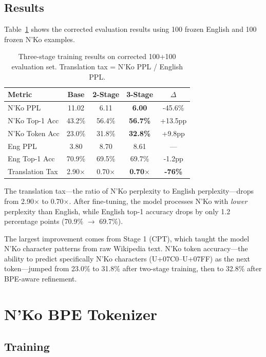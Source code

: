 \documentclass[11pt]{article}
\begin{document}
\subsection{Results}

Table~\ref{tab:main-results} shows the corrected evaluation results using 100 frozen English and 100 frozen N'Ko examples.

\begin{table}[t]
\centering
\small
\begin{tabular}{lcccc}
\toprule
\textbf{Metric} & \textbf{Base} & \textbf{2-Stage} & \textbf{3-Stage} & \textbf{$\Delta$} \\
\midrule
N'Ko PPL & 11.02 & 6.11 & \textbf{6.00} & -45.6\% \\
N'Ko Top-1 Acc & 43.2\% & 56.4\% & \textbf{56.7\%} & +13.5pp \\
N'Ko Token Acc & 23.0\% & 31.8\% & \textbf{32.8\%} & +9.8pp \\
\midrule
Eng PPL & 3.80 & 8.70 & 8.61 & --- \\
Eng Top-1 Acc & 70.9\% & 69.5\% & 69.7\% & -1.2pp \\
\midrule
Translation Tax & 2.90$\times$ & 0.70$\times$ & \textbf{0.70$\times$} & \textbf{-76\%} \\
\bottomrule
\end{tabular}
\caption{Three-stage training results on corrected 100+100 evaluation set. Translation tax = N'Ko PPL / English PPL.}
\label{tab:main-results}
\end{table}

The translation tax---the ratio of N'Ko perplexity to English perplexity---drops from 2.90$\times$ to 0.70$\times$.
After fine-tuning, the model processes N'Ko with \textit{lower} perplexity than English, while English top-1 accuracy drops by only 1.2 percentage points (70.9\% $\to$ 69.7\%).

The largest improvement comes from Stage 1 (CPT), which taught the model N'Ko character patterns from raw Wikipedia text.
N'Ko token accuracy---the ability to predict specifically N'Ko characters (U+07C0--U+07FF) as the next token---jumped from 23.0\% to 31.8\% after two-stage training, then to 32.8\% after BPE-aware refinement.

\section{N'Ko BPE Tokenizer}
\label{sec:tokenizer}

\subsection{Training}
\end{document}
